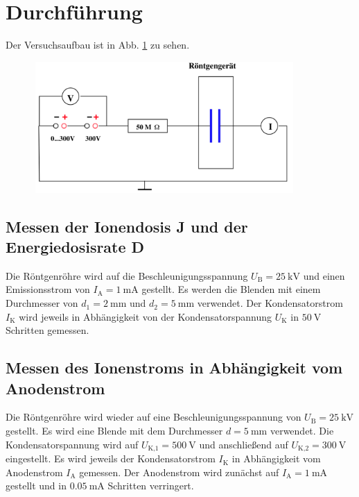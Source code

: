 \section{Durchführung}
\label{sec:Durchführung}

Der Versuchsaufbau ist in Abb. \ref{fig:aufbau} zu sehen.
\begin{figure}
    \centering
    \includegraphics[width=10cm, height=5cm]{build/aufbau.png}
    \caption{\cite{V607}}
    \label{fig:aufbau}
\end{figure}

\subsection{Messen der Ionendosis J und der Energiedosisrate D} %
Die Röntgenröhre wird auf die Beschleunigungsspannung
$U_\text{B} = \SI{25}{\kilo\volt}$ und einen Emissionsstrom 
von $I_\text{A} = \SI{1}{\milli\ampere}$ gestellt.
Es werden die Blenden mit einem Durchmesser von
$d_1 = \SI{2}{\milli\meter}$ und $d_2 = \SI{5}{\milli\meter}$ 
verwendet.
\newline
Der Kondensatorstrom $I_\text{K}$ wird jeweils in Abhängigkeit
von der Kondensatorspannung $U_\text{K}$ in $\SI{50}{\volt}$ 
Schritten gemessen.

\subsection{Messen des Ionenstroms in Abhängigkeit vom Anodenstrom}
Die Röntgenröhre wird wieder auf eine Beschleunigungsspannung von
$U_\text{B} = \SI{25}{\kilo\volt}$ gestellt. Es wird eine
Blende mit dem Durchmesser $d = \SI{5}{\milli\meter}$
verwendet. Die Kondensatorspannung wird auf 
$U_\text{K,1} = \SI{500}{\volt}$ und anschließend auf
$U_\text{K,2} = \SI{300}{\volt}$ eingestellt.
\newline
Es wird jeweils der Kondensatorstrom $I_\text{K}$ in
Abhängigkeit vom Anodenstrom $I_\text{A}$ gemessen.
Der Anodenstrom wird zunächst auf $I_\text{A} = \SI{1}{\milli\ampere}$
gestellt und in $\SI{0.05}{\milli\ampere}$ Schritten verringert.

